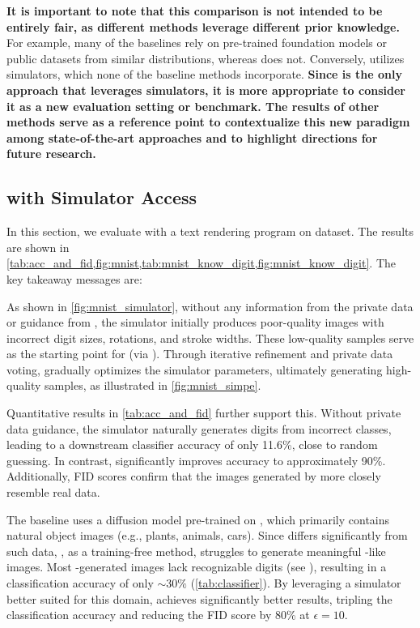 \textbf{It is important to note that this comparison is not intended to be entirely fair, as different methods leverage different prior knowledge.} For example, many of the baselines rely on pre-trained foundation models or public datasets from similar distributions, whereas \simpe{} does not. Conversely, \simpe{} utilizes simulators, which none of the baseline methods incorporate. \textbf{Since \simpe{} is the only approach that leverages simulators, it is more appropriate to consider it as a new evaluation setting or benchmark. The results of other methods serve as a reference point to contextualize this new paradigm among state-of-the-art approaches and to highlight directions for future research.}



\subsection{\simpe{} with Simulator Access}
\label{sec:exp_simulator}

In this section, we evaluate \simpe{} with a text rendering program on \mnist{} dataset. The results are shown in \cref{tab:acc_and_fid,fig:mnist,tab:mnist_know_digit,fig:mnist_know_digit}. The key takeaway messages are:




As shown in \cref{fig:mnist_simulator}, without any information from the private data or guidance from \simpe{}, the simulator initially produces poor-quality images with incorrect digit sizes, rotations, and stroke widths. These low-quality samples serve as the starting point for \simpe{} (via \randomsampleapiname{}). Through iterative refinement and private data voting, \simpe{} gradually optimizes the simulator parameters, ultimately generating high-quality \mnist{} samples, as illustrated in \cref{fig:mnist_simpe}.

Quantitative results in \cref{tab:acc_and_fid} further support this. Without private data guidance, the simulator naturally generates digits from incorrect classes, leading to a downstream classifier accuracy of only 11.6\%, close to random guessing. In contrast, \simpe{} significantly improves accuracy to approximately 90\%. Additionally, FID scores confirm that the images generated by \simpe{} more closely resemble real data.

The \pe{} baseline \cite{lin2023differentially} uses a diffusion model pre-trained on \imagenet{}, which primarily contains natural object images (e.g., plants, animals, cars). Since \mnist{} differs significantly from such data, \pe{}, as a training-free method, struggles to generate meaningful \mnist{}-like images. Most \pe{}-generated images lack recognizable digits (see \citet{dpimagebench}), resulting in a classification accuracy of only $\sim 30\%$ (\cref{tab:classifier}). By leveraging a simulator better suited for this domain, \simpe{} achieves significantly better results, tripling the classification accuracy and reducing the FID score by 80\% at $\epsilon=10$.

